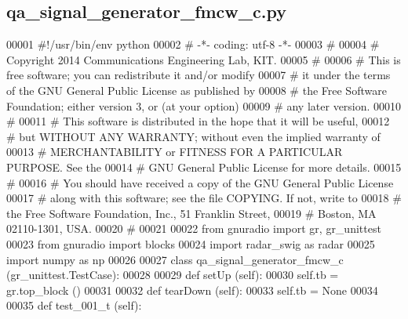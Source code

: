 \subsection{qa\+\_\+signal\+\_\+generator\+\_\+fmcw\+\_\+c.\+py}
\label{qa__signal__generator__fmcw__c_8py_source}

\begin{DoxyCode}
00001 \textcolor{comment}{#!/usr/bin/env python}
00002 \textcolor{comment}{# -*- coding: utf-8 -*-}
00003 \textcolor{comment}{# }
00004 \textcolor{comment}{# Copyright 2014 Communications Engineering Lab, KIT.}
00005 \textcolor{comment}{# }
00006 \textcolor{comment}{# This is free software; you can redistribute it and/or modify}
00007 \textcolor{comment}{# it under the terms of the GNU General Public License as published by}
00008 \textcolor{comment}{# the Free Software Foundation; either version 3, or (at your option)}
00009 \textcolor{comment}{# any later version.}
00010 \textcolor{comment}{# }
00011 \textcolor{comment}{# This software is distributed in the hope that it will be useful,}
00012 \textcolor{comment}{# but WITHOUT ANY WARRANTY; without even the implied warranty of}
00013 \textcolor{comment}{# MERCHANTABILITY or FITNESS FOR A PARTICULAR PURPOSE.  See the}
00014 \textcolor{comment}{# GNU General Public License for more details.}
00015 \textcolor{comment}{# }
00016 \textcolor{comment}{# You should have received a copy of the GNU General Public License}
00017 \textcolor{comment}{# along with this software; see the file COPYING.  If not, write to}
00018 \textcolor{comment}{# the Free Software Foundation, Inc., 51 Franklin Street,}
00019 \textcolor{comment}{# Boston, MA 02110-1301, USA.}
00020 \textcolor{comment}{# }
00021 
00022 \textcolor{keyword}{from} gnuradio \textcolor{keyword}{import} gr, gr\_unittest
00023 \textcolor{keyword}{from} gnuradio \textcolor{keyword}{import} blocks
00024 \textcolor{keyword}{import} radar\_swig \textcolor{keyword}{as} radar
00025 \textcolor{keyword}{import} numpy \textcolor{keyword}{as} np
00026 
00027 \textcolor{keyword}{class }qa_signal_generator_fmcw_c (gr\_unittest.TestCase):
00028 
00029     \textcolor{keyword}{def }setUp (self):
00030         self.tb = gr.top\_block ()
00031 
00032     \textcolor{keyword}{def }tearDown (self):
00033         self.tb = \textcolor{keywordtype}{None}
00034 
00035     \textcolor{keyword}{def }test_001_t (self):

\end{DoxyCode}
